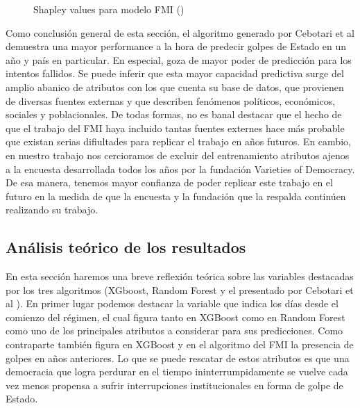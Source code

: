 \documentclass{article}
\begin{document}
\begin{figure}[H]
  \centering
  \caption{Shapley values para modelo FMI (\cite{Ceb24}) \label{fig:shapley_cebotari}}
\end{figure}

Como conclusión general de esta sección, el algoritmo generado por Cebotari et al demuestra una mayor 
performance a la hora de predecir golpes de Estado en un año y país en particular. En especial, goza
de mayor poder de predicción para los intentos fallidos. Se puede inferir que esta mayor capacidad
predictiva surge del amplio abanico de atributos con los que cuenta su base de datos, que provienen de
diversas fuentes externas y que describen fenómenos políticos, económicos, sociales y poblacionales. De
todas formas, no es banal destacar que el hecho de que el trabajo del FMI haya incluido tantas fuentes
externes hace más probable que existan serias difiultades para replicar el trabajo en años futuros. En 
cambio, en nuestro trabajo nos cercioramos de excluir del entrenamiento atributos ajenos a la encuesta
desarrollada todos los años por la fundación Varieties of Democracy. De esa manera, tenemos mayor 
confianza de poder replicar este trabajo en el futuro en la medida de que la encuesta y la fundación 
que la respalda continúen realizando su trabajo.

\subsection{Análisis teórico de los resultados}

En esta sección haremos una breve reflexión teórica sobre las variables destacadas por los tres 
algoritmos (XGboost, Random Forest y el presentado por Cebotari et al \citeyear{Ceb24}). En primer lugar
podemos destacar la variable que indica los días desde el comienzo del régimen, el cual figura tanto en 
XGBoost como en Random Forest como uno de los principales atributos a considerar para sus predicciones.
Como contraparte también figura en XGBoost y en el algoritmo del FMI la presencia de golpes en años
anteriores. Lo que se puede rescatar de estos atributos es que una democracia que logra perdurar en el
tiempo ininterrumpidamente se vuelve cada vez menos propensa a sufrir interrupciones institucionales en
forma de golpe de Estado.
\end{document}
